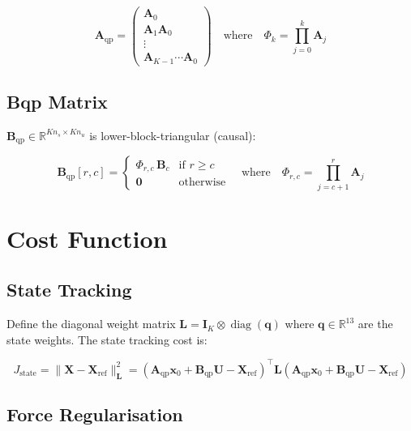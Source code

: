 \documentclass[12pt,a4paper]{report}
\newcommand{\vect}[1]{\bm{#1}}
\newcommand{\mat}[1]{\mathbf{#1}}
\newcommand{\R}{\mathbb{R}}
\DeclareMathOperator{\diag}{diag}
\begin{document}
\begin{equation}
    \mat{A}_{\mathrm{qp}} =
    \begin{pmatrix}
        \mat{A}_0 \\
        \mat{A}_1 \mat{A}_0 \\
        \vdots \\
        \mat{A}_{K-1}\cdots\mat{A}_0
    \end{pmatrix}
    \quad\text{where}\quad
    \Phi_k = \prod_{j=0}^{k}\mat{A}_j
\end{equation}

\subsection{Bqp Matrix}

$\mat{B}_{\mathrm{qp}} \in \R^{Kn_s \times Kn_u}$ is lower-block-triangular
(causal):

\begin{equation}
    \mat{B}_{\mathrm{qp}}[r,c] =
    \begin{cases}
        \Phi_{r,c}\,\mat{B}_c & \text{if } r \geq c \\
        \mat{0} & \text{otherwise}
    \end{cases}
    \quad\text{where}\quad
    \Phi_{r,c} = \prod_{j=c+1}^{r}\mat{A}_j
\end{equation}

\section{Cost Function}

\subsection{State Tracking}

Define the diagonal weight matrix $\mat{L} = \mat{I}_K \otimes \diag(\vect{q})$
where $\vect{q} \in \R^{13}$ are the state weights.  The state tracking cost is:

\begin{equation}
    J_\text{state} = \|\mat{X} - \mat{X}_\text{ref}\|^2_{\mat{L}}
    = (\mat{A}_{\mathrm{qp}}\vect{x}_0 + \mat{B}_{\mathrm{qp}}\mat{U} - \mat{X}_\text{ref})^\top
      \mat{L}
      (\mat{A}_{\mathrm{qp}}\vect{x}_0 + \mat{B}_{\mathrm{qp}}\mat{U} - \mat{X}_\text{ref})
\end{equation}

\subsection{Force Regularisation}
\end{document}
